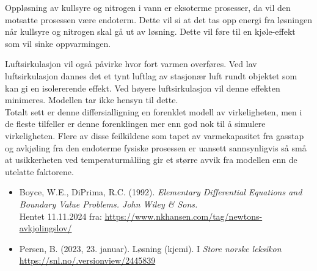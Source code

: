 \documentclass[a4paper,12pt]{article}
\begin{document}
Oppløsning av kullsyre og nitrogen i vann er eksoterme prosesser, da vil den motsatte prosessen være endoterm. Dette vil si at det tas opp energi fra løsningen når kullsyre og nitrogen skal gå ut av løsning. Dette vil føre til en kjøle-effekt som vil sinke oppvarmingen.

Luftsirkulasjon vil også påvirke hvor fort varmen overføres. Ved lav luftsirkulasjon dannes det et tynt luftlag av stasjonær luft rundt objektet som kan gi en isolererende effekt. Ved høyere luftsirkulasjon vil denne effekten minimeres. Modellen tar ikke hensyn til dette.\\

Totalt sett er denne differsialligning en forenklet modell av virkeligheten, men i de fleste tilfeller er denne forenklingen mer enn god nok til å simulere virkeligheten. Flere av disse feilkildene som tapet av varmekapasitet fra gasstap og avkjøling fra den endoterme fysiske prosessen er uansett sannsynligvis så små at usikkerheten ved temperaturmåliing gir et større avvik fra modellen enn de utelatte faktorene.
\\





\newpage

\begin{itemize}
    \item Boyce, W.E., DiPrima, R.C. (1992). \textit{Elementary Differential Equations and Boundary Value Problems. John Wiley & Sons.}\\
Hentet 11.11.2024 fra: \url{https://www.nkhansen.com/tag/newtons-avkjolingslov/}

    \item Persen, B. (2023, 23. januar). Løsning (kjemi). I \textit{Store norske leksikon} \\
    \url{https://snl.no/.versionview/2445839}
    
\end{itemize}
\end{document}
